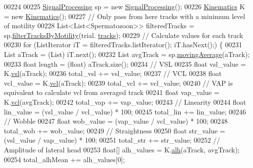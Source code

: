 \begin{DoxyCode}
{{{{00224 
00225     \hyperlink{classfunctions_1_1_signal_processing}{SignalProcessing} sp = \textcolor{keyword}{new} \hyperlink{classfunctions_1_1_signal_processing}{SignalProcessing}();
00226     \hyperlink{classfunctions_1_1_kinematics}{Kinematics} K = \textcolor{keyword}{new} \hyperlink{classfunctions_1_1_kinematics}{Kinematics}();
00227     \textcolor{comment}{// Only pass from here tracks with a minimum level of motility}
00228     List<List<Spermatozoon>> filteredTracks = sp.\hyperlink{classfunctions_1_1_signal_processing_a7302e4cf91bc23463aa9354325d2993d}{filterTracksByMotility}(trial.
      \hyperlink{classdata_1_1_trial_ab0c3156759c41236f7f0bc83e1e5ef8f}{tracks});
00229     \textcolor{comment}{// Calculate values for each track}
00230     \textcolor{keywordflow}{for} (ListIterator iT = filteredTracks.listIterator(); iT.hasNext();) \{
00231       List aTrack = (List) iT.next();
00232       List avgTrack = sp.\hyperlink{classfunctions_1_1_signal_processing_a4f10245c50d850b87d1ef4d81c28300d}{movingAverage}(aTrack);
00233       \textcolor{keywordtype}{float} length = (float) aTrack.size();
00234       \textcolor{comment}{// VSL}
00235       \textcolor{keywordtype}{float} vsl\_value = K.\hyperlink{classfunctions_1_1_kinematics_a938c4a9daa152f426259a01bc6654b25}{vsl}(aTrack);
00236       total\_vsl += vsl\_value;
00237       \textcolor{comment}{// VCL}
00238       \textcolor{keywordtype}{float} vcl\_value = K.\hyperlink{classfunctions_1_1_kinematics_af6e1e75567a927a9c627616cb68b0d7f}{vcl}(aTrack);
00239       total\_vcl += vcl\_value;
00240       \textcolor{comment}{// VAP is equivalent to calculate vcl from averaged track}
00241       \textcolor{keywordtype}{float} vap\_value = K.\hyperlink{classfunctions_1_1_kinematics_af6e1e75567a927a9c627616cb68b0d7f}{vcl}(avgTrack);
00242       total\_vap += vap\_value;
00243       \textcolor{comment}{// Linearity}
00244       \textcolor{keywordtype}{float} lin\_value = (vsl\_value / vcl\_value) * 100;
00245       total\_lin += lin\_value;
00246       \textcolor{comment}{// Wobble}
00247       \textcolor{keywordtype}{float} wob\_value = (vap\_value / vcl\_value) * 100;
00248       total\_wob += wob\_value;
00249       \textcolor{comment}{// Straightness}
00250       \textcolor{keywordtype}{float} str\_value = (vsl\_value / vap\_value) * 100;
00251       total\_str += str\_value;
00252       \textcolor{comment}{// Amplitude of lateral head}
00253       \textcolor{keywordtype}{float}[] alh\_values = K.\hyperlink{classfunctions_1_1_kinematics_a8f8221f314e814927fb192ea65f2af4a}{alh}(aTrack, avgTrack);
00254       total\_alhMean += alh\_values[0];
}}}}
\end{DoxyCode}

